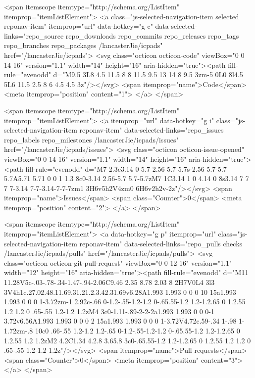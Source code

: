   <span itemscope itemtype="http://schema.org/ListItem" itemprop="itemListElement">
    <a class="js-selected-navigation-item selected reponav-item" itemprop="url" data-hotkey="g c" data-selected-links="repo_source repo_downloads repo_commits repo_releases repo_tags repo_branches repo_packages /lancasterJie/icpads" href="/lancasterJie/icpads">
      <svg class="octicon octicon-code" viewBox="0 0 14 16" version="1.1" width="14" height="16" aria-hidden="true"><path fill-rule="evenodd" d="M9.5 3L8 4.5 11.5 8 8 11.5 9.5 13 14 8 9.5 3zm-5 0L0 8l4.5 5L6 11.5 2.5 8 6 4.5 4.5 3z"/></svg>
      <span itemprop="name">Code</span>
      <meta itemprop="position" content="1">
</a>  </span>

    <span itemscope itemtype="http://schema.org/ListItem" itemprop="itemListElement">
      <a itemprop="url" data-hotkey="g i" class="js-selected-navigation-item reponav-item" data-selected-links="repo_issues repo_labels repo_milestones /lancasterJie/icpads/issues" href="/lancasterJie/icpads/issues">
        <svg class="octicon octicon-issue-opened" viewBox="0 0 14 16" version="1.1" width="14" height="16" aria-hidden="true"><path fill-rule="evenodd" d="M7 2.3c3.14 0 5.7 2.56 5.7 5.7s-2.56 5.7-5.7 5.7A5.71 5.71 0 0 1 1.3 8c0-3.14 2.56-5.7 5.7-5.7zM7 1C3.14 1 0 4.14 0 8s3.14 7 7 7 7-3.14 7-7-3.14-7-7-7zm1 3H6v5h2V4zm0 6H6v2h2v-2z"/></svg>
        <span itemprop="name">Issues</span>
        <span class="Counter">0</span>
        <meta itemprop="position" content="2">
</a>    </span>

  <span itemscope itemtype="http://schema.org/ListItem" itemprop="itemListElement">
    <a data-hotkey="g p" itemprop="url" class="js-selected-navigation-item reponav-item" data-selected-links="repo_pulls checks /lancasterJie/icpads/pulls" href="/lancasterJie/icpads/pulls">
      <svg class="octicon octicon-git-pull-request" viewBox="0 0 12 16" version="1.1" width="12" height="16" aria-hidden="true"><path fill-rule="evenodd" d="M11 11.28V5c-.03-.78-.34-1.47-.94-2.06C9.46 2.35 8.78 2.03 8 2H7V0L4 3l3 3V4h1c.27.02.48.11.69.31.21.2.3.42.31.69v6.28A1.993 1.993 0 0 0 10 15a1.993 1.993 0 0 0 1-3.72zm-1 2.92c-.66 0-1.2-.55-1.2-1.2 0-.65.55-1.2 1.2-1.2.65 0 1.2.55 1.2 1.2 0 .65-.55 1.2-1.2 1.2zM4 3c0-1.11-.89-2-2-2a1.993 1.993 0 0 0-1 3.72v6.56A1.993 1.993 0 0 0 2 15a1.993 1.993 0 0 0 1-3.72V4.72c.59-.34 1-.98 1-1.72zm-.8 10c0 .66-.55 1.2-1.2 1.2-.65 0-1.2-.55-1.2-1.2 0-.65.55-1.2 1.2-1.2.65 0 1.2.55 1.2 1.2zM2 4.2C1.34 4.2.8 3.65.8 3c0-.65.55-1.2 1.2-1.2.65 0 1.2.55 1.2 1.2 0 .65-.55 1.2-1.2 1.2z"/></svg>
      <span itemprop="name">Pull requests</span>
      <span class="Counter">0</span>
      <meta itemprop="position" content="3">
</a>  </span>

